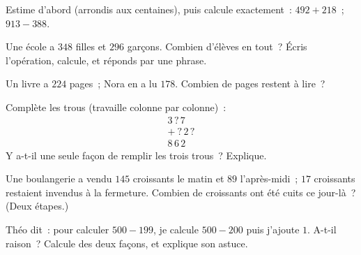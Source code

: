 \begin{exercise}[$\star$]\label{exo:g3:addsub:6}
Estime d'abord (arrondis aux centaines), puis calcule exactement~:
$492 + 218$~; \quad $913 - 388$.
\end{exercise}

\begin{exercise}[$\star$]\label{exo:g3:addsub:7}
Une école a $348$ filles et $296$ garçons. Combien d'élèves
en tout~? Écris l'opération, calcule, et réponds par une phrase.
\end{exercise}

\begin{exercise}[$\star$]\label{exo:g3:addsub:8}
Un livre a $224$ pages~; Nora en a lu $178$. Combien de pages
restent à lire~?
\end{exercise}

\begin{exercise}[$\star$]\label{exo:g3:addsub:9}
Complète les trous (travaille colonne par colonne)~:
\[
\begin{array}{r}
3\,?\,7 \\
+\ ?\,2\,? \\
\hline
8\,6\,2
\end{array}
\]
Y a-t-il une seule façon de remplir les trois trous~? Explique.
\end{exercise}

\begin{exercise}[$\star\star$]\label{exo:g3:addsub:10}
Une boulangerie a vendu $145$ croissants le matin et $89$
l'après-midi~; $17$ croissants restaient invendus à la fermeture.
Combien de croissants ont été cuits ce jour-là~? (Deux
étapes.)
\end{exercise}

\begin{exercise}[$\star\star$]\label{exo:g3:addsub:11}
Théo dit~: \guillemotleft{} pour calculer $500 - 199$, je calcule
$500 - 200$ puis j'ajoute $1$. \guillemotright{} A-t-il raison~?
Calcule des deux façons, et explique son astuce.
\end{exercise}
